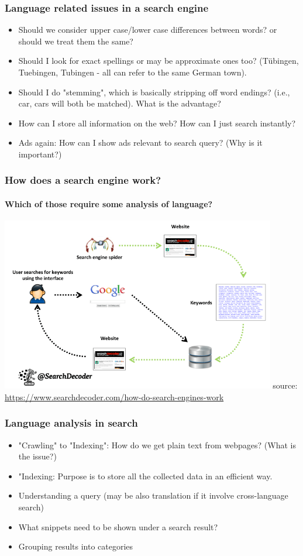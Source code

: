 \documentclass{beamer}
\begin{document}
\begin{frame}
\frametitle{Language related issues in a search engine}
\begin{itemize}
\item Should we consider upper case/lower case differences between words? or should we treat them the same? \pause
\item Should I look for exact spellings or may be approximate ones too? \pause (T\"ubingen, Tuebingen, Tubingen - all can refer to the same German town). \pause 
\item Should I do "stemming", which is basically stripping off word endings? (i.e., car, cars will both be matched). What is the advantage? \pause
\item How can I store all information on the web? How can I just search instantly? \pause
\item Ads again: How can I show ads relevant to search query? (Why is it important?)
\end{itemize}
\end{frame}

\begin{frame}
\frametitle{How does a search engine work?}
\framesubtitle{Which of those require some analysis of language?}
\includegraphics[width=0.9\textwidth]{search.png}
\medskip \tiny source: \url{https://www.searchdecoder.com/how-do-search-engines-work}
\end{frame}

\begin{frame}
\frametitle{Language analysis in search}
\begin{itemize}
\item "Crawling" to "Indexing": How do we get plain text from webpages? (What is the issue?)
\item "Indexing: Purpose is to store all the collected data in an efficient way.
\item Understanding a query (may be also translation if it involve cross-language search)
\item What snippets need to be shown under a search result?
\item Grouping results into categories
\end{itemize}
\end{frame}
\end{document}
